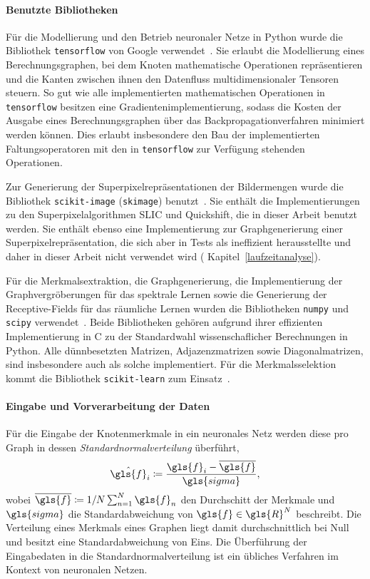 \paragraph{Benutzte Bibliotheken}
\label{benutzte_bibliotheken}

Für die Modellierung und den Betrieb neuronaler Netze in Python wurde die Bibliothek \texttt{tensorflow} von Google verwendet~\cite{tensorflow}.
Sie erlaubt die Modellierung eines Berechnungsgraphen, bei dem Knoten mathematische Operationen repräsentieren und die Kanten zwischen ihnen den Datenfluss multidimensionaler Tensoren steuern.
So gut wie alle implementierten mathematischen Operationen in \texttt{tensorflow} besitzen eine Gradientenimplementierung, sodass die Kosten der Ausgabe eines Berechnungsgraphen über das Backpropagationverfahren minimiert werden können.
Dies erlaubt insbesondere den Bau der implementierten Faltungsoperatoren mit den in \texttt{tensorflow} zur Verfügung stehenden Operationen.

Zur Generierung der Superpixelrepräsentationen der Bildermengen wurde die Bibliothek \texttt{scikit-image} (\texttt{skimage}) benutzt~\cite{scikit}.
Sie enthält die Implementierungen zu den Superpixelalgorithmen \gls{SLIC} und Quickshift, die in dieser Arbeit benutzt werden.
Sie enthält ebenso eine Implementierung zur Graphgenerierung einer Superpixelrepräsentation, die sich aber in Tests als ineffizient herausstellte und daher in dieser Arbeit nicht verwendet wird (\vgl{} Kapitel~\ref{laufzeitanalyse}).

Für die Merkmalsextraktion, die Graphgenerierung, die Implementierung der Graphvergröberungen für das spektrale Lernen sowie die Generierung der Receptive-Fields für das räumliche Lernen wurden die Bibliotheken \texttt{numpy} und \texttt{scipy} verwendet~\cite{numpy, scipy}.
Beide Bibliotheken gehören aufgrund ihrer effizienten Implementierung in C zu der Standardwahl wissenschaflicher Berechnungen in Python.
Alle dünnbesetzten Matrizen, \dhe{} Adjazenzmatrizen sowie Diagonalmatrizen, sind insbesondere auch als solche implementiert.
Für die Merkmalsselektion kommt die Bibliothek \texttt{scikit-learn} zum Einsatz~\cite{scikitlearn}.

\paragraph{Eingabe und Vorverarbeitung der Daten}

Für die Eingabe der Knotenmerkmale in ein neuronales Netz werden diese pro Graph in dessen \emph{Standardnormalverteilung} überführt, \dhe{}~\cite{tensorflow}
\begin{equation*}
  \hat{\gls{f}}_i \coloneqq \frac{\gls{f}_i - \overline{\gls{f}}}{\gls{sigma}},
\end{equation*}
wobei $\overline{\gls{f}} \coloneqq 1/N \sum_{n=1}^N \gls{f}_n$ den Durchschitt der Merkmale und $\gls{sigma}$ die Standardabweichung von $\gls{f} \in \gls{R}^N$ beschreibt.
Die Verteilung eines Merkmals eines Graphen liegt damit durchschnittlich bei Null und besitzt eine Standardabweichung von Eins.
Die Überführung der Eingabedaten in die Standardnormalverteilung ist ein übliches Verfahren im Kontext von neuronalen Netzen.

